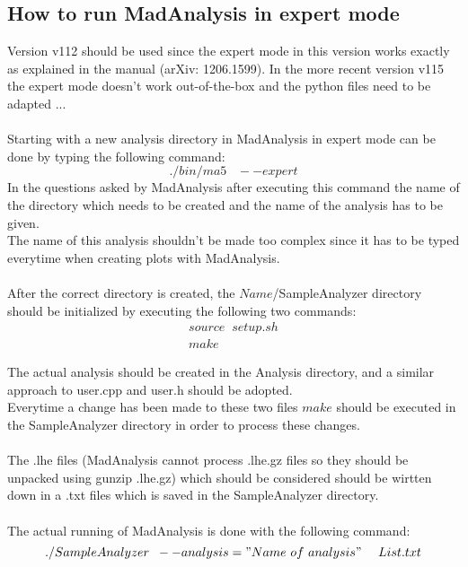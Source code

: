 \documentclass[a4paper,12pt]{report}
\begin{document}
\subsection{How to run MadAnalysis in expert mode}
Version v112 should be used since the expert mode in this version works exactly as explained in the manual (arXiv: 1206.1599). 
In the more recent version v115 the expert mode doesn't work out-of-the-box and the python files need to be adapted ...\\
\\
Starting with a new analysis directory in MadAnalysis in expert mode can be done by typing the following command:
\begin{equation}
  ./bin/ma5 \; \; \; --expert
\end{equation}
In the questions asked by MadAnalysis after executing this command the name of the directory which needs to be created and the name of the analysis has to be given.\\
The name of this analysis shouldn't be made too complex since it has to be typed everytime when creating plots with MadAnalysis.\\
\\
After the correct directory is created, the $Name$/SampleAnalyzer directory should be initialized by executing the following two commands:
\begin{eqnarray}
  source \; \; setup.sh \\
  make
\end{eqnarray}

The actual analysis should be created in the Analysis directory, and a similar approach to user.cpp and user.h should be adopted.\\
Everytime a change has been made to these two files $make$ should be executed in the SampleAnalyzer directory in order to process these changes.\\
\\
The .lhe files (MadAnalysis cannot process .lhe.gz files so they should be unpacked using gunzip .lhe.gz) which should be considered should be wirtten down in a .txt files which is saved in the SampleAnalyzer directory. \\
\\
The actual running of MadAnalysis is done with the following command:
\begin{equation}
  ./SampleAnalyzer \; \; --analysis="Name ~ of ~ analysis" ~~~~ List.txt
\end{equation}
\end{document}
